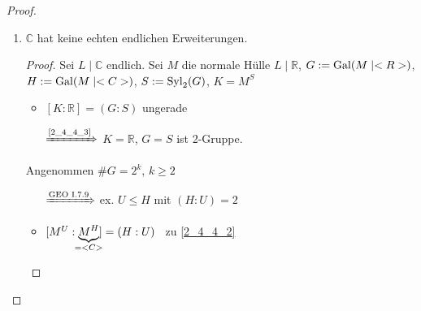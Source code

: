 \begin{proof}
\begin{enumerate}[label={Beh. \arabic*:},left=0pt,labelwidth=7em,topsep=-6pt,align=left,ref={Beh.~\arabic*}]
		\begin{proof}
			$[L\mid\mathbb R] = n$ ungerade \begin{itemize}[topsep=-6pt,label={$\Rightarrow$},widest={$\xRightarrow{\propref{1_9_5}}$},leftmargin=*]
				\item[$\xRightarrow{\propref{1_9_5}}$] $L=\mathbb R(\alpha)$ für ein $\alpha$
				\item $f:=\MinPol(\alpha\mid\mathbb R)$ hat Grad $\deg(f) = \deg(\alpha\mid \mathbb R) = [\mathbb R(\alpha):\mathbb R] = n$ ungerade
			\end{itemize}
			\begin{align*}
				\hspace*{-3em}\left.\begin{array}{@{}l}
					f\;\text{ist irreduzibel} \\
					f\;\text{hat Nullstelle in $\mathbb R$ nach \propref{2_4_1_3}}
				\end{array}\right\rbrace \quad\Rightarrow\quad \deg(f) = 1\quad\Rightarrow\quad L =\mathbb R
			\end{align*}
		\end{proof}
	
		\item $\mathbb C$ hat keine echten endlichen Erweiterungen.
		
		\begin{proof}
			Sei $L\mid\mathbb C$ endlich. Sei $M$ die normale Hülle $L\mid\mathbb R$, $G:=\operatorname{Gal}(M\mid <R>)$, $H:= \operatorname{Gal}(M\mid <C>)$, $S := \operatorname{Syl}_2(G)$, $K=M^S$
					
			\begin{minipage}{0.6\linewidth}
			\begin{itemize}[topsep=-6pt,label={$\Rightarrow$},widest={$\xRightarrow{\text{GEO~I.7.9}}$},leftmargin=*]
				\item $[K:\mathbb R] = (G:S)$ ungerade
				\item[$\xRightarrow{\text{\ref{2_4_4_3}}}$] $K=\mathbb R$, $G=S$ ist 2-Gruppe.
			\end{itemize}
			\medskip
			Angenommen $\# G = 2^k$, $k\ge 2$\begin{itemize}[topsep=-6pt,label={$\Rightarrow$},widest={$\xRightarrow{\text{GEO~I.7.9}}$},leftmargin=*]
				\item[$\xRightarrow{\text{GEO~I.7.9}}$] ex. $U\le H$ mit $(H:U) = 2$
				\item $[M^U:\underbrace{M^H}_{\mathclap{=\mathbb C}}] = (H:U)$ \Lightning\ zu \ref{2_4_4_2}
			\end{itemize}
			\bigskip
			\end{minipage}%
			\hfill%
			\begin{minipage}{0.35\linewidth}
\end{minipage}
\end{proof}
\end{enumerate}
\end{proof}
